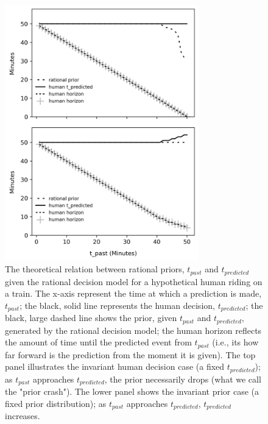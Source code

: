 \documentclass[a4paper,man,natbib]{apa6}
\begin{document}
\begin{figure}
    \centering
    \includegraphics[width=0.75\textwidth]{Figures/Theory_PriorShift_1_2panel.png}
    \caption{\footnotesize{The theoretical relation between rational priors, $t_{past}$ and $t_{predicted}$ given the rational decision model for a hypothetical human riding on a train.  The x-axis represent the time at which a prediction is made, $t_{past}$;  the black, solid line represents the human decision, $t_{predicted}$; the black, large dashed line shows the prior, given $t_{past}$ and $t_{predicted}$, generated by the rational decision model; the human horizon reflects the amount of time until the predicted event from $t_{past}$ (i.e., its how far forward is the prediction from the moment it is given).  The top panel illustrates the invariant human decision case (a fixed $t_{predicted}$); as $t_{past}$ approaches $t_{predicted}$, the prior necessarily drops (what we call the "prior crash").  The lower panel shows the invariant prior case (a fixed prior distribution); as $t_{past}$ approaches $t_{predicted}$, $t_{predicted}$ increases.  
    }}
    \label{fig:PriorShift2Panel}
\end{figure}
\end{document}
